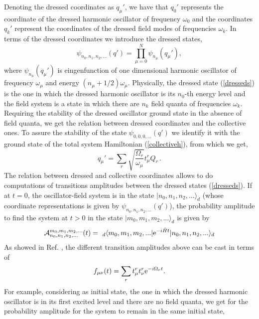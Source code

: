 \documentclass[10pt,english,twocolumn]{revtex4}
\begin{document}
Denoting the dressed coordinates as
$q_\mu'$, we have that $q_0'$ represents the coordinate of the dressed harmonic oscillator of frequency $\omega_0$ and
the coordinates $q_k'$ represent the coordinates of the dressed field modes of frequencies $\omega_k$. In terms of
the dressed coordinates we introduce the dressed states,
%
\begin{equation}
\psi_{n_0,n_1,n_2,...}(q')=\prod_{\mu=0}^N\psi_{n_\mu}(q_\mu'),
\label{dresseds}
\end{equation}
%
where $\psi_{n_\mu}(q_\mu')$ is eingenfunction of one dimensional harmonic oscillator of frequency $\omega_\mu$ and energy
$(n_\mu+1/2)\omega_\mu$. Physically, the dressed state (\ref{dresseds}) is the one in which the dressed harmonic oscillator
is its $n_0$-th energy level and the field system is a state in which there are $n_k$ field quanta of frequencies $\omega_k$. Requiring the
stability of the dressed oscillator ground state  in the absence of field quanta, we get  the relation between dressed
coordinates and the collective ones. To assure the stability of the state $\psi_{0,0,0,...}(q')$ we identify it with the ground state
of the total system Hamiltonian (\ref{collectiveh}), from which we get, 
%
\begin{equation}
q_\mu'=\sum_r \sqrt{\frac{\Omega_r}{\omega_\mu}} t_\mu^r Q_r\,.
\label{dressedtocolective}
\end{equation}
%
The relation between dressed and collective coordinates allows to do computations of transitions amplitudes between the
dressed states (\ref{dresseds}). If at $t=0$, the oscillator-field system is in the state $|n_0,n_1,n_2,...\rangle_d$ (whose coordinate 
representations is given by $\psi_{n_0,n_1,n_2,...}(q') $), the probability amplitude to find the system at $t>0$ in the state
$|m_0,m_1,m_2,...\rangle_d$ is given by
%
\begin{equation}
{\cal A}_{n_0,n_1,n_2,...}^{m_0,m_1,m_2,...}(t)=~_d~\!\!\langle m_0,m_1,m_2,...|{\rm e}^{-i\hat{H}t}
|n_0,n_1,n_2,...\rangle_d
\label{amplitude}
\end{equation}
%
As showed in Ref. \cite{casana}, the different transition amplitudes above can be cast in terms of
%
\begin{equation}
f_{\mu\nu}(t)=\sum_{r} t_\mu^r t_\nu^r {\rm e}^{-i\Omega_r t}.
\label{fmunu}
\end{equation}
%
For  example, considering as initial state, the one in which the dressed harmonic oscillator is in its first excited level and there are no field
quanta, we get for the probability amplitude for the system to remain in the same initial state,
\end{document}
